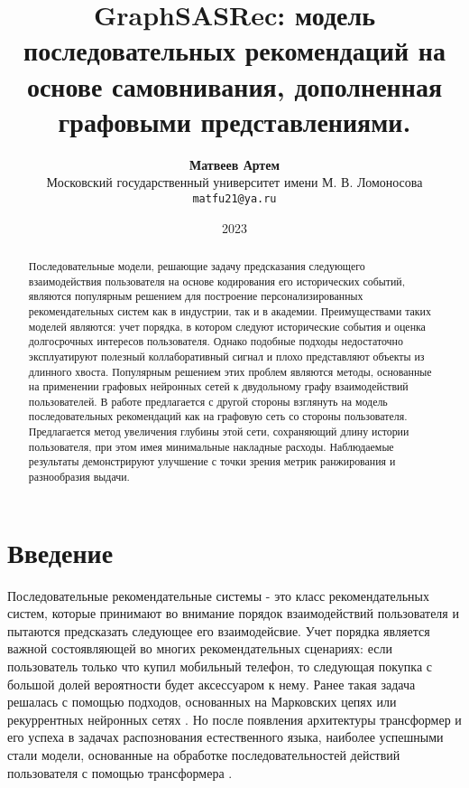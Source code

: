 \documentclass{article}
\title{GraphSASRec: модель последовательных рекомендаций на основе самовнивания, дополненная графовыми представлениями.}
\author{ 
	\textbf{Матвеев Артем} \\
    Московский государственный университет имени М. В. Ломоносова \\
	\texttt{matfu21@ya.ru} \\
}
\date{2023}
\begin{document}
\maketitle

\begin{abstract}
	Последовательные модели, решающие задачу предсказания следующего взаимодействия пользователя на 
	основе кодирования его исторических событий, являются популярным решением для построение 
	персонализированных рекомендательных систем как в индустрии, так и в академии. Преимуществами 
	таких моделей являются: учет порядка, в котором следуют исторические события и оценка долгосрочных 
	интересов пользователя. Однако подобные подходы недостаточно эксплуатируют полезный коллаборативный
	сигнал и плохо представляют объекты из длинного хвоста. Популярным решением этих проблем являются 
	методы, основанные на применении графовых нейронных сетей к двудольному графу взаимодействий 
	пользователей. В работе предлагается с другой стороны взглянуть на модель последовательных рекомендаций
	как на графовую сеть со стороны пользователя. Предлагается метод увеличения глубины этой сети,
	сохраняющий длину истории пользователя, при этом имея минимальные накладные расходы. Наблюдаемые 
	результаты демонстрируют улучшение с точки зрения метрик ранжирования и разнообразия выдачи.
\end{abstract}



\section{Введение}

Последовательные рекомендательные системы - это класс рекомендательных систем, которые принимают 
во внимание порядок взаимодействий пользователя и пытаются предсказать следующее его взаимодейсвие.
Учет порядка является важной состоявляющей во многих рекомендательных сценариях: если пользователь
только что купил мобильный телефон, то следующая покупка с большой долей вероятности будет 
аксессуаром к нему. Ранее такая задача решалась с помощью подходов, основанных на Марковских 
цепях \cite{mc} или рекуррентных нейронных сетях \cite{rnn1,rnn2,rnn3}. Но после появления архитектуры
трансформер \cite{transformer} и его успеха в задачах распознования естественного языка, наиболее успешными
стали модели, основанные на обработке последовательностей действий пользователя с помощью трансформера 
\cite{sasrec,bert4rec,gsasrec}. 
\end{document}
